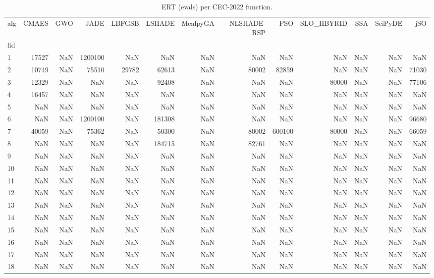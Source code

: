 \begin{table}
\caption{ERT (evals) per CEC-2022 function.}
\label{tab:ert_cec2022}
\begin{tabular}{lrrrrrrrrrrrr}
\toprule
alg & CMAES & GWO & JADE & LBFGSB & LSHADE & MealpyGA & NLSHADE-RSP & PSO & SLO_HBYRID & SSA & SciPyDE & jSO \\
fid &  &  &  &  &  &  &  &  &  &  &  &  \\
\midrule
1 & 17527 & NaN & 1200100 & NaN & NaN & NaN & NaN & NaN & NaN & NaN & NaN & NaN \\
2 & 10749 & NaN & 75510 & 29782 & 62613 & NaN & 80002 & 82859 & NaN & NaN & NaN & 71030 \\
3 & 12329 & NaN & NaN & NaN & 92408 & NaN & NaN & NaN & 80000 & NaN & NaN & 77106 \\
4 & 16457 & NaN & NaN & NaN & NaN & NaN & NaN & NaN & NaN & NaN & NaN & NaN \\
5 & NaN & NaN & NaN & NaN & NaN & NaN & NaN & NaN & NaN & NaN & NaN & NaN \\
6 & NaN & NaN & 1200100 & NaN & 181308 & NaN & NaN & NaN & NaN & NaN & NaN & 96680 \\
7 & 40059 & NaN & 75362 & NaN & 50300 & NaN & 80002 & 600100 & 80000 & NaN & NaN & 66059 \\
8 & NaN & NaN & NaN & NaN & 184715 & NaN & 82761 & NaN & NaN & NaN & NaN & NaN \\
9 & NaN & NaN & NaN & NaN & NaN & NaN & NaN & NaN & NaN & NaN & NaN & NaN \\
10 & NaN & NaN & NaN & NaN & NaN & NaN & NaN & NaN & NaN & NaN & NaN & NaN \\
11 & NaN & NaN & NaN & NaN & NaN & NaN & NaN & NaN & NaN & NaN & NaN & NaN \\
12 & NaN & NaN & NaN & NaN & NaN & NaN & NaN & NaN & NaN & NaN & NaN & NaN \\
13 & NaN & NaN & NaN & NaN & NaN & NaN & NaN & NaN & NaN & NaN & NaN & NaN \\
14 & NaN & NaN & NaN & NaN & NaN & NaN & NaN & NaN & NaN & NaN & NaN & NaN \\
15 & NaN & NaN & NaN & NaN & NaN & NaN & NaN & NaN & NaN & NaN & NaN & NaN \\
16 & NaN & NaN & NaN & NaN & NaN & NaN & NaN & NaN & NaN & NaN & NaN & NaN \\
17 & NaN & NaN & NaN & NaN & NaN & NaN & NaN & NaN & NaN & NaN & NaN & NaN \\
18 & NaN & NaN & NaN & NaN & NaN & NaN & NaN & NaN & NaN & NaN & NaN & NaN \\

\end{tabular}
\end{table}
